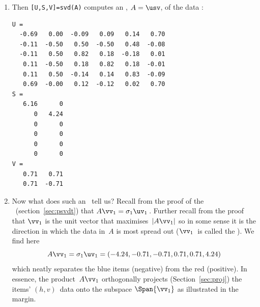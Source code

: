 \begin{example}
\begin{solution}
\begin{enumerate}
\item Then \verb|[U,S,V]=svd(A)| computes an \svd, \(A=\usv\), of the data \twodp:
\begin{verbatim}
U =
  -0.69   0.00  -0.09   0.09   0.14   0.70
  -0.11  -0.50   0.50  -0.50   0.48  -0.08
  -0.11   0.50   0.82   0.18  -0.18   0.01
   0.11  -0.50   0.18   0.82   0.18  -0.01
   0.11   0.50  -0.14   0.14   0.83  -0.09
   0.69  -0.00   0.12  -0.12   0.02   0.70
S =
   6.16      0
      0   4.24
      0      0
      0      0
      0      0
      0      0
V =
   0.71   0.71
   0.71  -0.71
\end{verbatim}

\item Now what does such an \svd\ tell us?
Recall from the proof of the \svd\ (section~\ref{sec:psvdt}) that \(A\vv_1=\sigma_1\uv_1\)\,. 
Further recall from the proof that \(\vv_1\) is the unit vector that maximises~\(|A\vv_1|\) so in some sense it is the direction in which the data in~\(A\) is most spread out (\(\vv_1\)~is called the ).
We find here \twodp
\begin{equation*}
A\vv_1=\sigma_1\uv_1=(-4.24,-0.71,-0.71,0.71,0.71,4.24)
\end{equation*}
which neatly separates the blue items (negative) from the red (positive).
%
In essence, the product~\(A\vv_1\) orthogonally projects (Section~\ref{sec:proj}) the items' \((h,v)\)~data onto the subspace \(\Span\{\vv_1\}\) as illustrated in the margin. 
\end{enumerate}
\end{solution}
\end{example}

